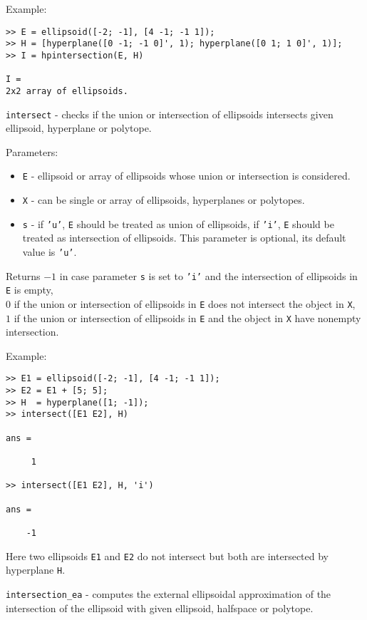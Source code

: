 Example:
{\tt \begin{verbatim}
>> E = ellipsoid([-2; -1], [4 -1; -1 1]);
>> H = [hyperplane([0 -1; -1 0]', 1); hyperplane([0 1; 1 0]', 1)];
>> I = hpintersection(E, H)

I =
2x2 array of ellipsoids.
\end{verbatim} }

\newpage

{\Large {\tt intersect}} - checks if the union or intersection of ellipsoids
intersects given ellipsoid, hyperplane or polytope.

Parameters:
\begin{itemize}
\item {\tt E} - ellipsoid or array of ellipsoids whose union or intersection
is considered.
\item {\tt X} - can be single or array of ellipsoids, hyperplanes or polytopes.
\item {\tt s} - if {\tt 'u'}, {\tt E} should be treated as union of ellipsoids,
if {\tt 'i'}, {\tt E} should be treated as intersection of ellipsoids.
This parameter is optional, its default value is {\tt 'u'}.
\end{itemize}

Returns $-1$ in case parameter {\tt s} is set to {\tt 'i'} and the
intersection of ellipsoids in {\tt E} is empty,\\
$0$ if the union or intersection of ellipsoids in {\tt E} does not intersect
the object in {\tt X},\\
$1$ if the union or intersection of ellipsoids in {\tt E} and the object
in {\tt X} have nonempty intersection.

Example:
{\tt \begin{verbatim}
>> E1 = ellipsoid([-2; -1], [4 -1; -1 1]);
>> E2 = E1 + [5; 5];
>> H  = hyperplane([1; -1]);
>> intersect([E1 E2], H)

ans =

     1

>> intersect([E1 E2], H, 'i')

ans =

    -1
\end{verbatim} }
Here two ellipsoids {\tt E1} and {\tt E2} do not intersect but both are
intersected by hyperplane {\tt H}.

\newpage

{\Large {\tt intersection\_ea}} - computes the external ellipsoidal
approximation of the intersection of the ellipsoid with given ellipsoid,
halfspace or polytope.

